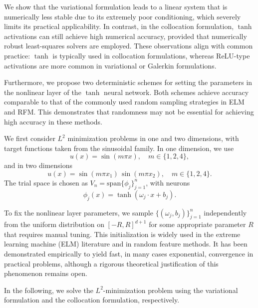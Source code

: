 \documentclass{article}
\theoremstyle{remark}
\begin{document}
We show that the variational formulation leads to a linear system that is numerically less stable due to its extremely poor conditioning, which severely limits its practical applicability.
In contrast, in the collocation formulation, $\tanh$ activations can still achieve high numerical accuracy, provided that numerically robust least-squares solvers are employed.
These observations align with common practice: $\tanh$ is typically used in collocation formulations, whereas ReLU-type activations are more common in variational or Galerkin formulations.

Furthermore, we propose two deterministic schemes for setting the parameters in the nonlinear layer of the $\tanh$ neural network.
Both schemes achieve accuracy comparable to that of the commonly used random sampling strategies in ELM and RFM. 
This demonstrates that randomness may not be essential for achieving high accuracy in these methods.

We first consider $L^2$ minimization problems in one and two dimensions, 
with target functions taken from the sinusoidal family. 
In one dimension, we use
\begin{equation} \label{eq:tanh-l2min-1d}
u(x) = \sin(m \pi x), \quad m \in \{1,2,4\},
\end{equation}
and in two dimensions
\begin{equation}\label{eq:tanh-l2min-2d}
u(x) = \sin(m \pi x_1)\,\sin(m \pi x_2), \quad m \in \{1,2,4\}.    
\end{equation}
The trial space is chosen as $V_n = \mathrm{span}\{\phi_j\}_{j=1}^n$, 
with neurons
\[
\phi_j(x) = \tanh(\omega_j \cdot x + b_j).
\]

To fix the nonlinear layer parameters, we sample $\{(\omega_j,b_j)\}_{j=1}^n$ 
independently from the uniform distribution on $[-R,R]^{d+1}$ for some 
appropriate parameter $R$ that requires manual tuning. 
This initialization is widely used in the extreme learning machine (ELM) literature and in random feature methods. 
It has been demonstrated empirically to yield fast, in many cases 
exponential, convergence in practical problems, although a rigorous 
theoretical justification of this phenomenon remains open.

In the following, we solve the $L^2$-minimization problem using the variational formulation and the collocation formulation,  respectively. 
\end{document}
